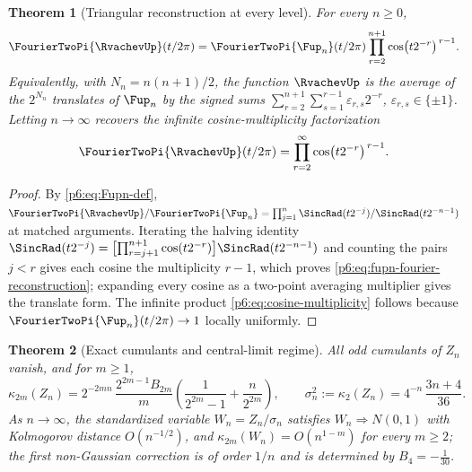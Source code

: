 \documentclass[11pt,oneside]{article}
\numberwithin{equation}{section}
\newtheorem{theorem}{Theorem}[section]
\theoremstyle{definition}
\theoremstyle{remark}
\begin{document}
\begin{theorem}[Triangular reconstruction at every level]
\label{p6:thm:fupn-reconstruction}
For every $n\ge0$,
\begin{equation}\label{p6:eq:fupn-fourier-reconstruction}
 \FourierTwoPi{\RvachevUp}(t/2\pi)
 =\FourierTwoPi{\Fup_n}(t/2\pi)
 \prod_{r=2}^{n+1}\cos\bigl(t2^{-r}\bigr)^{\,r-1}.
\end{equation}
Equivalently, with $N_n=n(n+1)/2$, the function $\RvachevUp$ is the average of the
$2^{N_n}$ translates of $\Fup_n$ by the signed sums
$\sum_{r=2}^{n+1}\sum_{s=1}^{r-1}\varepsilon_{r,s}2^{-r}$,
$\varepsilon_{r,s}\in\{\pm1\}$.  Letting $n\to\infty$ recovers the infinite
cosine-multiplicity factorization
\begin{equation}\label{p6:eq:cosine-multiplicity}
 \FourierTwoPi{\RvachevUp}(t/2\pi)=\prod_{r=2}^{\infty}\cos\bigl(t2^{-r}\bigr)^{\,r-1}.
\end{equation}
\end{theorem}

\begin{proof}
By \eqref{p6:eq:Fupn-def},
$\FourierTwoPi{\RvachevUp}/\FourierTwoPi{\Fup_n}
=\prod_{j=1}^{n}\SincRad(t2^{-j})/\SincRad(t2^{-n-1})$ at matched arguments.
Iterating the halving identity
$\SincRad(t2^{-j})=\bigl[\prod_{r=j+1}^{n+1}\cos(t2^{-r})\bigr]
\SincRad(t2^{-n-1})$ and counting the pairs $j<r$ gives each cosine the
multiplicity $r-1$, which proves
\eqref{p6:eq:fupn-fourier-reconstruction}; expanding every cosine as a
two-point averaging multiplier gives the translate form.  The infinite product
\eqref{p6:eq:cosine-multiplicity} follows because
$\FourierTwoPi{\Fup_n}(t/2\pi)\to1$ locally uniformly.
\end{proof}

\begin{theorem}[Exact cumulants and central-limit regime]
\label{p6:thm:fupn-clt}
All odd cumulants of $Z_n$ vanish, and for $m\ge1$,
\begin{equation}\label{p6:eq:Zn-cumulants}
 \kappa_{2m}(Z_n)
 =2^{-2mn}\,\frac{2^{2m-1}B_{2m}}{m}
 \left(\frac1{2^{2m}-1}+\frac{n}{2^{2m}}\right),
 \qquad
 \sigma_n^2:=\kappa_2(Z_n)=4^{-n}\,\frac{3n+4}{36}.
\end{equation}
As $n\to\infty$, the standardized variable $W_n=Z_n/\sigma_n$ satisfies
$W_n\Rightarrow N(0,1)$ with Kolmogorov distance $O(n^{-1/2})$, and
$\kappa_{2m}(W_n)=O(n^{1-m})$ for every $m\ge2$; the first non-Gaussian
correction is of order $1/n$ and is determined by $B_4=-\tfrac1{30}$.
\end{theorem}
\end{document}
